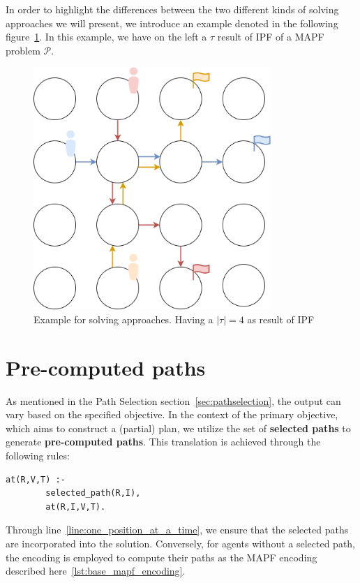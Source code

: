 In order to highlight the differences between the two different kinds of solving approaches we will present, we introduce an example denoted in the following figure~\ref{fig:partial_solving_example}. In this example, we have on the left a \(\tau\) result of IPF of a MAPF problem \(\mathcal{P}\).

\begin{figure}[H]
    \centering
    \caption{Example for solving approaches. Having a \(|\tau| = 4\) as result of IPF}\label{fig:partial_solving_example}
    \includegraphics[width=9cm]{img/partial_solving_example.png}
\end{figure}




\section{Pre-computed paths}
As mentioned in the Path Selection section~\ref{sec:pathselection}, the output can vary based on the specified objective. In the context of the primary objective, which aims to construct a (partial) plan, we utilize the set of \textbf{selected paths} to generate \textbf{pre-computed paths}. This translation is achieved through the following rules:

\begin{minipage}[H]{\linewidth}
\begin{lstlisting}[style=mystyle]
    at(R,V,T) :- 
        selected_path(R,I), 
        at(R,I,V,T).
\end{lstlisting}
\end{minipage} 
\noindent Through line~\ref{line:one_position_at_a_time}, we ensure that the selected paths are incorporated into the solution. Conversely, for agents without a selected path, the encoding is employed to compute their paths as the MAPF encoding described here~\ref{lst:base_mapf_encoding}.

